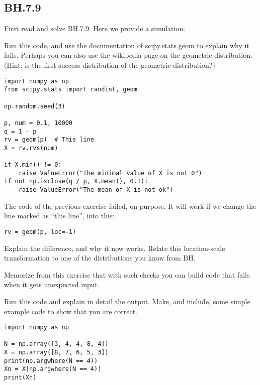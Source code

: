\subsection{BH.7.9}
\label{sec:bh.7.9}

First read and solve BH.7.9. Here we provide a simulation.

\begin{exercise}
Run this code, and use the documentation of scipy.stats.geom to explain why it fails. Perhaps you can also use the wikipedia page on the geometric distribution. (Hint: is the first success distribution of the geometric distribution?)
\begin{verbatim}
import numpy as np
from scipy.stats import randint, geom

np.random.seed(3)

p, num = 0.1, 10000
q = 1 - p
rv = geom(p)  # This line
X = rv.rvs(num)

if X.min() != 0:
    raise ValueError("The minimal value of X is not 0")
if not np.isclose(q / p, X.mean(), 0.1):
    raise ValueError("The mean of X is not ok")
\end{verbatim}
\end{exercise}

\begin{exercise}
The code of the previous exercise failed, on purpose.   It will work if we change the line marked as ``this line'', into this:
\begin{verbatim}
rv = geom(p, loc=-1)
\end{verbatim}
Explain the difference, and why it now works. Relate this location-scale transformation to one of the distributions you know from BH.
\end{exercise}

Memorize from this exercise that with such checks you can build code that fails when it gets unexpected input.


\begin{exercise}
Run this code and explain in detail the output. Make, and include, some simple example code to show that you are correct.

\begin{verbatim}
import numpy as np

N = np.array([3, 4, 4, 8, 4])
X = np.array([8, 7, 6, 5, 3])
print(np.argwhere(N == 4))
Xn = X[np.argwhere(N == 4)]
print(Xn)
\end{verbatim}
\end{exercise}

